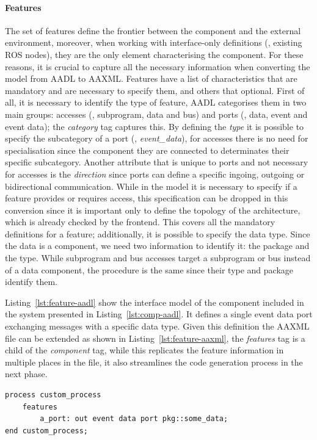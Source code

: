 \paragraph{Features} The set of features define the frontier between the component and the external environment, moreover, when working with interface-only definitions (\eg, existing ROS nodes), they are the only element characterising the component. For these reasons, it is crucial to capture all the necessary information when converting the model from AADL to AAXML. Features have a list of characteristics that are mandatory and are necessary to specify them, and others that optional. First of all, it is necessary to identify the type of feature, AADL categorises them in two main groups: accesses (\ie, subprogram, data and bus) and ports (\ie, data, event and event data); the \textit{category} tag captures this. By defining the \textit{type} it is possible to specify the subcategory of a port (\eg, \textit{event\_data}), for accesses there is no need for specialisation since the component they are connected to determinates their specific subcategory. Another attribute that is unique to ports and not necessary for accesses is the \textit{direction} since ports can define a specific ingoing, outgoing or bidirectional communication. While in the model it is necessary to specify if a feature provides or requires access, this specification can be dropped in this conversion since it is important only to define the topology of the architecture, which is already checked by the frontend. This covers all the mandatory definitions for a feature; additionally, it is possible to specify the data type. Since the data is a component, we need two information to identify it: the package and the type. While subprogram and bus accesses target a subprogram or bus instead of a data component, the procedure is the same since their type and package identify them.

Listing~\ref{lst:feature-aadl} show the interface model of the component included in the system presented in Listing~\ref{lst:comp-aadl}. It defines a single event data port exchanging messages with a specific data type. Given this definition the AAXML file can be extended as shown in Listing~\ref{lst:feature-aaxml}, the \textit{features} tag is a child of the \textit{component} tag, while this replicates the feature information in multiple places in the file, it also streamlines the code generation process in the next phase.

\begin{lstlisting}[language=AADL,caption={Minimal AADL model containing features},label=lst:feature-aadl]
process custom_process
	features
		a_port: out event data port pkg::some_data;
end custom_process;
\end{lstlisting}

